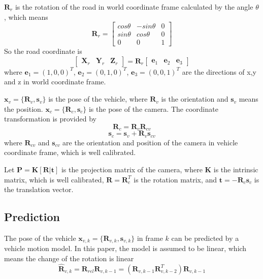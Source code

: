 \documentclass[letterpaper, 10 pt, conference]{ieeeconf}  %
\begin{document}
$\mathbf{R}_r$ is the rotation of the road in world coordinate frame calculated by the angle $\theta$, which means
\begin{equation}
\mathbf{R}_r =\begin{bmatrix}   cos\theta & -sin\theta & 0 \\
                                sin\theta & cos\theta & 0 \\
                                0 & 0 & 1
                    \end{bmatrix}
\end{equation}
So the road coordinate is 
\begin{equation}
\begin{bmatrix} \mathbf{X}_r & \mathbf{Y}_r & \mathbf{Z}_r \end{bmatrix}
= \mathbf{R}_r
\begin{bmatrix} \mathbf{e}_1 & \mathbf{e}_2 & \mathbf{e}_3 \end{bmatrix} 
\end{equation}
where $\mathbf{e}_1=(1,0,0)^T$, $\mathbf{e}_2=(0,1,0)^T$, $\mathbf{e}_3=(0,0,1)^T$ are the directions of x,y and z in world coordinate frame.

$\mathbf{x}_{v} = \{\mathbf{R}_{v}, \mathbf{s}_{v}\}$ is the pose of the vehicle, where $\mathbf{R}_v$ is the orientation and $\mathbf{s}_v$ means the position. $\mathbf{x}_{c} = \{\mathbf{R}_{c}, \mathbf{s}_{c}\}$ is the pose of the camera. The coordinate transformation is provided by
\begin{equation}
\mathbf{R}_{c} = \mathbf{R}_v \mathbf{R}_{cv}
\label{eq:R_c}
\end{equation}
\begin{equation}
\mathbf{s}_{c} = \mathbf{s}_v + \mathbf{R}_{v} \mathbf{s}_{cv}
\label{eq:S_c}
\end{equation}
where $\mathbf{R}_{cv}$ and $\mathbf{s}_{cv}$ are the orientation and position of the camera in vehicle coordinate frame, which is well calibrated.

Let $\mathbf{P}=\mathbf{K}[\mathbf{R}|\mathbf{t}]$ is the projection matrix of the camera, where $\mathbf{K}$ is the intrinsic matrix, which is well calibrated, $\mathbf{R}=\mathbf{R}_c^T$ is the rotation matrix, and $\mathbf{t}=-\mathbf{R}_c\mathbf{s}_c$ is the translation vector.

\subsection{Prediction}
The pose of the vehicle $\mathbf{x}_{v,k} = \{\mathbf{R}_{v,k}, \mathbf{s}_{v,k}\}$ in frame $k$ can be predicted by a vehicle motion model. In this paper, the model is assumed to be linear, which means the change of the rotation is linear
\begin{equation}
\hat{\mathbf{R}}_{v,k}=\mathbf{R}_{rel}\mathbf{R}_{v,k-1}=\left(\mathbf{R}_{v,k-1}\mathbf{R}_{v,k-2}^T\right)\mathbf{R}_{v,k-1}
\label{eq:R_t_predict}
\end{equation}
\end{document}
